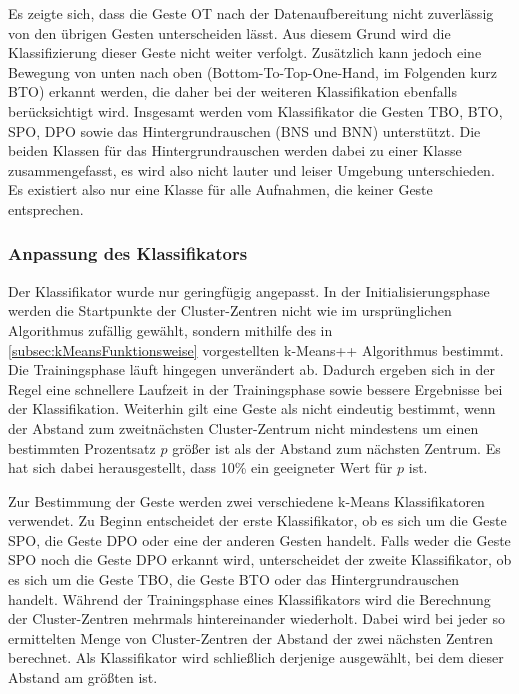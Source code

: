 Es zeigte sich, dass die Geste \ac{OT} nach der Datenaufbereitung nicht zuverlässig von den übrigen Gesten unterscheiden lässt. Aus diesem Grund wird die Klassifizierung dieser Geste nicht weiter verfolgt. Zusätzlich kann jedoch eine Bewegung von unten nach oben (Bottom-To-Top-One-Hand, im Folgenden kurz BTO) erkannt werden, die daher bei der weiteren Klassifikation ebenfalls berücksichtigt wird. Insgesamt werden vom Klassifikator die Gesten \ac{TBO}, BTO, \ac{SPO}, \ac{DPO} sowie das Hintergrundrauschen (\ac{BNS} und \ac{BNN}) unterstützt. Die beiden Klassen für das Hintergrundrauschen werden dabei zu einer Klasse zusammengefasst, es wird also nicht lauter und leiser Umgebung unterschieden. Es existiert also nur eine Klasse für alle Aufnahmen, die keiner Geste entsprechen.

\subsubsection{Anpassung des Klassifikators}
Der Klassifikator wurde nur geringfügig angepasst.
In der Initialisierungsphase werden die Startpunkte der Cluster-Zentren nicht wie im ursprünglichen Algorithmus zufällig gewählt, sondern mithilfe des in \autoref{subsec:kMeansFunktionsweise} vorgestellten k-Means++ Algorithmus bestimmt. Die Trainingsphase läuft hingegen unverändert ab.
Dadurch ergeben sich in der Regel eine schnellere Laufzeit in der Trainingsphase sowie bessere Ergebnisse bei der Klassifikation.
Weiterhin gilt eine Geste als nicht eindeutig bestimmt, wenn der Abstand zum zweitnächsten Cluster-Zentrum nicht mindestens um einen bestimmten Prozentsatz $p$ größer ist als der Abstand zum nächsten Zentrum. Es hat sich dabei herausgestellt, dass 10\% ein geeigneter Wert für $p$ ist.




Zur Bestimmung der Geste werden zwei verschiedene k-Means Klassifikatoren verwendet. Zu Beginn entscheidet der erste Klassifikator, ob es sich um die Geste \ac{SPO}, die Geste \ac{DPO} oder eine der anderen Gesten handelt.
Falls weder die Geste \ac{SPO} noch die Geste \ac{DPO} erkannt wird, unterscheidet der zweite Klassifikator, ob es sich um die Geste \ac{TBO}, die Geste BTO oder das Hintergrundrauschen handelt. 
Während der Trainingsphase eines Klassifikators wird die Berechnung der Cluster-Zentren mehrmals hintereinander wiederholt. Dabei wird bei jeder so ermittelten Menge von Cluster-Zentren der Abstand der zwei nächsten Zentren berechnet. Als Klassifikator wird schließlich derjenige ausgewählt, bei dem dieser Abstand am größten ist.


